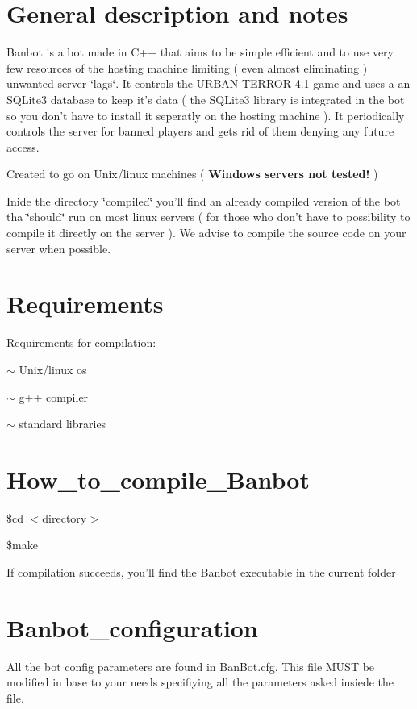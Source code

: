 \hypertarget{main_intro_sec}{}\section{General description and notes}\label{main_intro_sec}
Banbot is a bot made in C++ that aims to be simple efficient and to use very few resources of the hosting machine limiting ( even almost eliminating ) unwanted server \char`\"{}lags\char`\"{}. It controls the URBAN TERROR 4.1 game and uses a an SQLite3 database to keep it's data ( the SQLite3 library is integrated in the bot so you don't have to install it seperatly on the hosting machine ). It periodically controls the server for banned players and gets rid of them denying any future access.

Created to go on Unix/linux machines ( {\bfseries Windows servers not tested!} )

Inide the directory \char`\"{}compiled\char`\"{} you'll find an already compiled version of the bot tha \char`\"{}should\char`\"{} run on most linux servers ( for those who don't have to possibility to compile it directly on the server ). We advise to compile the source code on your server when possible.\hypertarget{main_Requirements}{}\section{Requirements}\label{main_Requirements}
Requirements for compilation: \begin{DoxyItemize}
\item $\sim$ Unix/linux os \item $\sim$ g++ compiler \item $\sim$ standard libraries\end{DoxyItemize}
\hypertarget{main_How_to_compile_Banbot}{}\section{How\_\-to\_\-compile\_\-Banbot}\label{main_How_to_compile_Banbot}
\begin{DoxyItemize}
\item \$cd $<$directory$>$ \item \$make\end{DoxyItemize}
If compilation succeeds, you'll find the Banbot executable in the current folder\hypertarget{main_Banbot_configuration}{}\section{Banbot\_\-configuration}\label{main_Banbot_configuration}
All the bot config parameters are found in BanBot.cfg. This file MUST be modified in base to your needs specifiying all the parameters asked insiede the file.

